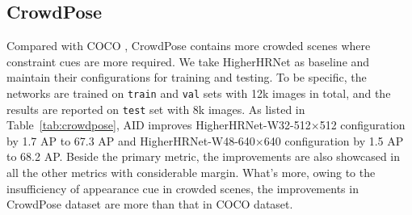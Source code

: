 \documentclass[final]{cvpr}
\begin{document}
\subsection{CrowdPose}
Compared with COCO \cite{COCO}, CrowdPose \cite{Crowdpose} contains more crowded scenes where constraint cues are more required. We take HigherHRNet \cite{Higher} as baseline and maintain their configurations for training and testing. To be specific, the networks are trained on \texttt{train} and \texttt{val} sets with 12k images in total, and the results are reported on \texttt{test} set with 8k images. As listed in Table~\ref{tab:crowdpose}, AID improves HigherHRNet-W32-512$\times$512 configuration by 1.7 AP to 67.3 AP and HigherHRNet-W48-640$\times$640 configuration by 1.5 AP to 68.2 AP. Beside the primary metric, the improvements are also showcased in all the other metrics with considerable margin. What's more, owing to the insufficiency of appearance cue in crowded scenes, the improvements in CrowdPose dataset are more than that in COCO dataset.
\end{document}
